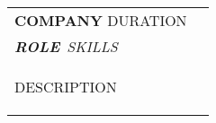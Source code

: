 \begin{tabularx}{\linewidth}{ @{}l r@{} }
\textbf{{{{COMPANY}}}} \hfill  {{DURATION}} \\[2pt]
\textbf{\textit{{{ROLE}}}}\ \hfill  \textit{{{SKILLS}}} \\[2pt]
\begin{minipage}[t]{\linewidth}
    \begin{itemize}[nosep,after=\strut, leftmargin=2em, itemsep=2pt]
        {{DESCRIPTION}}
    \end{itemize}
\end{minipage}
\end{tabularx}